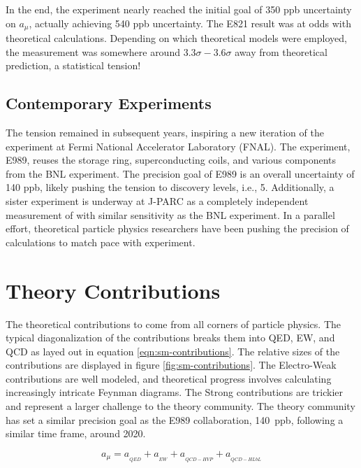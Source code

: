 In the end, the experiment nearly reached the initial goal of 350 ppb uncertainty on $a_\mu$, actually achieving 540 ppb uncertainty\cite{e821-prd}.  The E821 \gmtwo result was at odds with theoretical calculations.  Depending on which theoretical models were employed, the measurement was somewhere around $3.3\sigma - 3.6\sigma$ away from theoretical prediction, a statistical tension!

\subsection{Contemporary Experiments}
The tension remained in subsequent years, inspiring a new iteration of the \mugmtwo experiment at Fermi National Accelerator Laboratory (FNAL). The experiment, E989, reuses the storage ring, superconducting coils, and various components from the BNL experiment.  The precision goal of E989 is an overall uncertainty of 140 ppb, likely pushing the tension to discovery levels, i.e., \SI{5}{\sigma}. Additionally, a sister experiment is underway at J-PARC as a completely independent measurement of \mugmtwo with similar sensitivity as the BNL experiment.  In a parallel effort, theoretical particle physics researchers have been pushing the precision of calculations to match pace with experiment\cite{e989-tdr}.

\section{Theory Contributions} \label{sec:theory}

The theoretical contributions to \mugmtwo come from all corners of particle physics.  The typical diagonalization of the contributions breaks them into QED, EW, and QCD as layed out in equation \ref{eqn:sm-contributions}. The relative sizes of the contributions are displayed in figure \ref{fig:sm-contributions}. The Electro-Weak contributions are well modeled, and theoretical progress involves calculating increasingly intricate Feynman diagrams.  The Strong contributions are trickier and represent a larger challenge to the theory community.  The theory community has set a similar precision goal as the E989 collaboration, \SI{140}{ppb}, following a similar time frame, around 2020\cite{e989-tdr}.

\begin{equation}
\label{eqn:sm-contributions}
a_\mu = a_{_{QED}} + a_{_{EW}} + a_{_{QCD-HVP}} + a_{_{QCD-HLbL}}
\end{equation}

